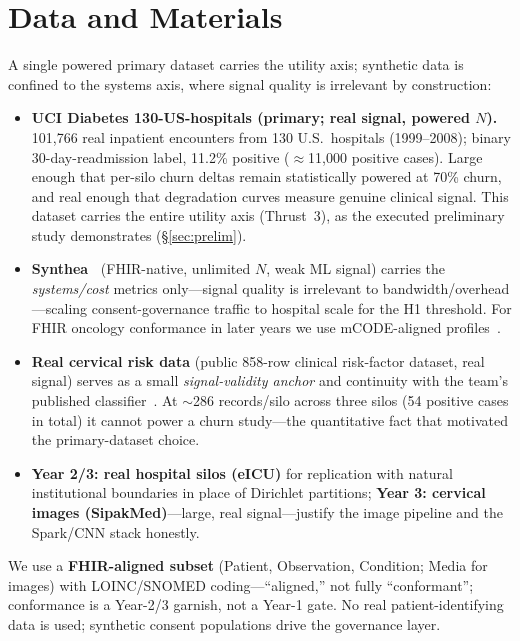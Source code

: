 \documentclass[11pt]{article}
\begin{document}
\section{Data and Materials}\label{sec:data}
A single powered primary dataset carries the utility axis; synthetic data is
confined to the systems axis, where signal quality is irrelevant by
construction:
\begin{itemize}
\item \textbf{UCI Diabetes 130-US-hospitals (primary; real signal, powered
$N$).} 101{,}766 real inpatient encounters from 130 U.S.\ hospitals
(1999--2008); binary 30-day-readmission label, 11.2\% positive ($\approx$11{,}000
positive cases). Large enough that per-silo churn deltas remain statistically
powered at 70\% churn, and real enough that degradation curves measure genuine
clinical signal. This dataset carries the entire utility axis (Thrust~3), as
the executed preliminary study demonstrates (\S\ref{sec:prelim}).
\item \textbf{Synthea~\cite{synthea}} (FHIR-native, unlimited $N$, weak ML
signal) carries the \emph{systems/cost} metrics only---signal quality is
irrelevant to bandwidth/overhead---scaling consent-governance traffic to
hospital scale for the H1 threshold. For FHIR oncology conformance in later
years we use mCODE-aligned profiles~\cite{mcode}.
\item \textbf{Real cervical risk data} (public 858-row clinical risk-factor
dataset, real signal) serves as a small \emph{signal-validity anchor} and
continuity with the team's published classifier~\cite{cervical}. At $\sim$286
records/silo across three silos (54 positive cases in total) it cannot power a
churn study---the quantitative fact that motivated the primary-dataset choice.
\item \textbf{Year 2/3: real hospital silos (eICU)} for replication with natural
institutional boundaries in place of Dirichlet partitions; \textbf{Year 3:
cervical images (SipakMed)}---large, real signal---justify
the image pipeline and the Spark/CNN stack honestly.
\end{itemize}
We use a \textbf{FHIR-aligned subset} (Patient, Observation, Condition; Media for
images) with LOINC/SNOMED coding---``aligned,'' not fully ``conformant'';
conformance is a Year-2/3 garnish, not a Year-1 gate. No real patient-identifying
data is used; synthetic consent populations drive the governance layer.
\end{document}
